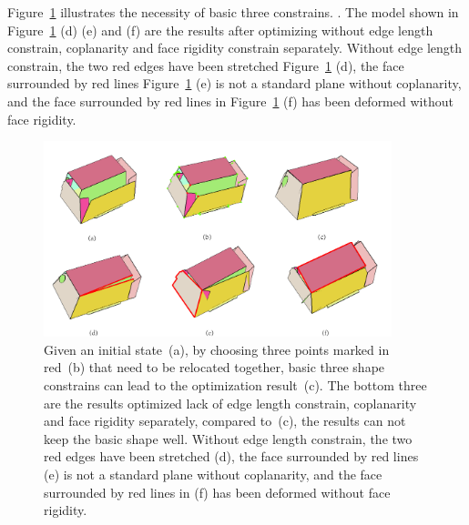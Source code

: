 Figure~\ref{fig:constrain} illustrates the necessity of basic three constrains.
{. The model shown in Figure~\ref{fig:constrain} (d) (e) and (f) are the results after optimizing without edge length constrain, coplanarity and face rigidity constrain separately. Without edge length constrain, the two red edges have been stretched Figure~\ref{fig:constrain} (d), the face surrounded by red lines Figure~\ref{fig:constrain} (e) is not a standard plane without coplanarity, and the face surrounded by red lines in Figure~\ref{fig:constrain} (f) has been deformed without face rigidity.}

\begin{figure}
	\centering
	\includegraphics[width=0.9\textwidth]{images/constrain.jpg}
	\caption{Given an initial state~(a), by choosing three points marked in red~(b) that need to be relocated together, basic three shape constrains can lead to the optimization result~(c). The bottom three are the results optimized lack of edge length constrain, coplanarity and face rigidity separately, compared to~(c), the results can not keep the basic shape well. Without edge length constrain, the two red edges have been stretched (d), the face surrounded by red lines (e) is not a standard plane without coplanarity, and the face surrounded by red lines in (f) has been deformed without face rigidity.}
	\label{fig:constrain}
\end{figure}

